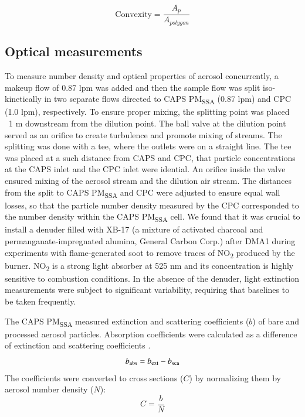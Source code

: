 \begin{equation}
    \mathrm{Convexity}=\frac{A_p}{A_{polygon}}
    \label{eq:convexity}
\end{equation}

\subsection{Optical measurements}

To measure number density and optical properties of aerosol concurrently, a makeup flow of 0.87 lpm was added and then the sample flow was split iso-kinetically in two separate flows directed to CAPS PM\textsubscript{SSA} (0.87 lpm) and CPC (1.0 lpm), respectively. To ensure proper mixing, the splitting point was placed ~1 m downstream from the dilution point. The ball valve at the dilution point served as an orifice to create turbulence and promote mixing of streams. The splitting was done with a tee, where the outlets were on a straight line. The tee was placed at a such distance from CAPS and CPC, that particle concentrations at the CAPS inlet and the CPC inlet were idential. An orifice inside the valve ensured mixing of the aerosol stream and the dilution air stream. The distances from the split to CAPS PM\textsubscript{SSA} and CPC were adjusted to ensure equal wall losses, so that the particle number density measured by the CPC corresponded to the number density within the CAPS PM\textsubscript{SSA} cell. We found that it was crucial to install a denuder filled with XB-17 (a mixture of activated charcoal and permanganate-impregnated alumina, General Carbon Corp.) after DMA1 during experiments with flame-generated soot to remove traces of NO\textsubscript{2} produced by the burner. NO\textsubscript{2} is a strong light absorber at 525 nm and its concentration is highly sensitive to combustion conditions. In the absence of the denuder, light extinction measurements were subject to significant variability, requiring that baselines to be taken frequently.

The CAPS PM\textsubscript{SSA} measured extinction and scattering coefficients ($b$) of bare and processed aerosol particles. Absorption coefficients were calculated as a difference of extinction and scattering coefficients \citep{RN7,RN50}.
\begin{equation}
b_{\rm abs}=b_{\rm ext}-b_{\rm sca}
\label{eq:babs}
\end{equation}
The coefficients were converted to cross sections ($C$) by normalizing them by aerosol number density ($N$):
\begin{equation}
C=\frac{b}{N}
\label{eq:copt}
\end{equation}

